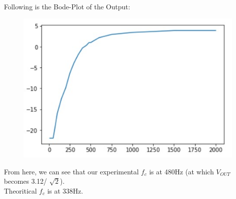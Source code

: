 \documentclass[12pt]{article}
\begin{document}
Following is the Bode-Plot of the Output:
\begin{figure}[H]
\begin{center}
\includegraphics[scale = 0.8]{highe.jpeg}
\end{center}
\end{figure}

From here, we can see that our experimental $f_c$ is at 480Hz (at which $V_{OUT}$ becomes 3.12/ $\sqrt{2} $).\\
Theoritical $f_c$ is at 338Hz.
\end{document}

